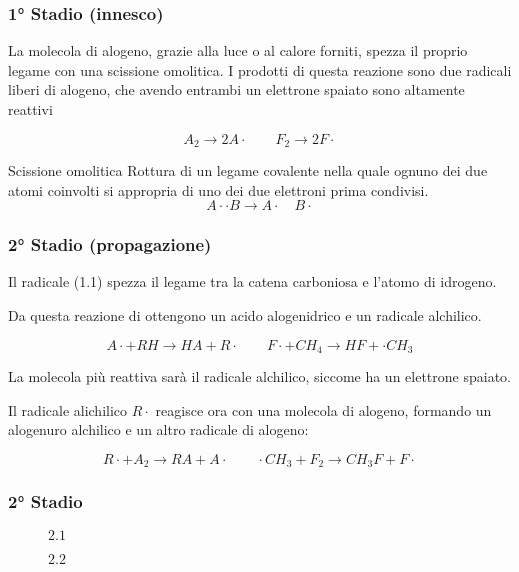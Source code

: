 \documentclass{beamer}
\begin{document}
	
	\begin{frame}[label=innesco]
		\frametitle{1° Stadio (innesco)}
		La molecola di alogeno, grazie alla luce o al calore forniti, spezza il proprio legame con una scissione  omolitica.
		I prodotti di questa reazione sono due radicali liberi di alogeno, che avendo entrambi un elettrone spaiato sono altamente reattivi
		
		\[
		A_2 \longrightarrow 2A\cdot\quad\quad 	F_2 \longrightarrow 2F\cdot\tag{1.1}
		\]
		\begin{block}{Scissione omolitica}
			Rottura di un legame covalente nella quale ognuno dei due atomi coinvolti si appropria di uno dei due elettroni prima condivisi.
			$$
			A\cdot\cdot B\longrightarrow A\cdot\quad B\cdot
			$$
			
		\end{block}
		
	\end{frame}
	\begin{frame}[label=propagazione]
		\frametitle{2° Stadio (propagazione)}
	    Il radicale (1.1) spezza il legame tra la catena carboniosa e l'atomo di idrogeno.
	    
	    Da questa reazione di ottengono un \alert{acido alogenidrico} e un \alert{radicale alchilico}.
		
		\[
	     A\cdot+ RH \longrightarrow{} HA +  R\cdot\quad\quad 	F\cdot + CH_4 \longrightarrow{} HF + \cdot CH_3   \tag{2.1}
		\]
		
		La molecola più reattiva sarà il radicale alchilico, siccome ha un elettrone spaiato.
		
		Il radicale alichilico $R\cdot$ reagisce ora con una molecola di alogeno, formando un alogenuro alchilico e un altro radicale di alogeno:
		
		 	
		 \[
		 R\cdot+ A_2 \longrightarrow{} RA +  A\cdot\quad\quad 	\cdot CH_3 + F_2   \longrightarrow{}CH_3F + F\cdot   \tag{2.2}
		 \]
		 
	\end{frame}
	\begin{frame}
	\frametitle{2° Stadio}
		\begin{figure}
		\centering
		\caption{$2.1$}
	\end{figure}
		\begin{figure}
		\centering
	\caption{$2.2$}
	\end{figure}
	\end{frame}
\end{document}
